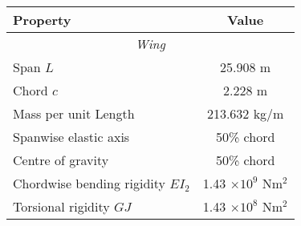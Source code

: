\documentclass{standalone}
\begin{document}
    \centering
    \begin{tabular}{l c}
    \toprule
    \toprule
    Property&Value\\
    \midrule
    \multicolumn{2}{c}{\textit{Wing}}\\
    Span $L$     & 25.908 m  \\
    Chord $c$   & 2.228 m \\
    Mass per unit Length     & 213.632 kg/m\\
    Spanwise elastic axis   & 50\% chord\\
    Centre of gravity   & 50\% chord\\
    Chordwise bending rigidity $EI_2$   & 1.43 $\times 10^9$ Nm$^2$\\
    Torsional rigidity $GJ$ & 1.43 $\times 10^8$ Nm$^2$\\
    \bottomrule
    \bottomrule
    \end{tabular}
    
\end{document}
